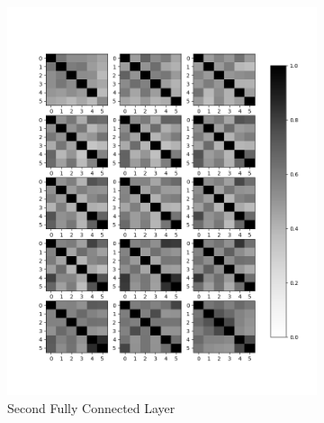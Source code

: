 \documentclass[11pt, twocolumn]{article}
\begin{document}
\begin{figure}
\begin{subfigure}[b]{0.475\textwidth}
		\includegraphics[width=\textwidth]{figs/f1.png}
		\caption[]%
		{{\small Second Fully Connected Layer}}    
		\label{fig:f1}
	\end{subfigure}
	\quad
	\begin{subfigure}[b]{0.475\textwidth}   
		\centering 

\end{subfigure}
\end{figure}
\end{document}
